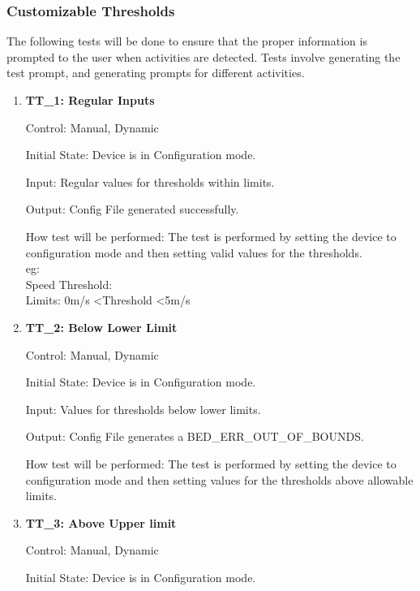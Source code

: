 \documentclass[12pt, titlepage]{article}
\begin{document}
\newpage

\subsubsection{Customizable Thresholds}

The following tests will be done to ensure that the proper information is prompted to the user when activities are detected. Tests involve generating the test prompt, and generating prompts for different activities.
		
\begin{enumerate}
	\item{\textbf{TT\_1: Regular Inputs} \\}\label{TT1}
	
		Control: Manual, Dynamic
							
		Initial State: Device is in Configuration mode.
							
		Input: Regular values for thresholds within limits.
		
		Output: Config File generated successfully.
		
		How test will be performed: The test is performed by setting the device to configuration mode and then setting valid values for the thresholds.\\
		eg: \\
		Speed Threshold:\\
		Limits: 0m/s \textless Threshold \textless 5m/s

	\item{\textbf{TT\_2: Below Lower Limit} \\}\label{TT2}
	
		Control: Manual, Dynamic
							
		Initial State: Device is in Configuration mode.
							
		Input: Values for thresholds below lower limits.
		
		Output: Config File generates a BED\_ERR\_OUT\_OF\_BOUNDS.

		How test will be performed: The test is performed by setting the device to configuration mode and then setting values for the thresholds above allowable limits.


	\item{\textbf{TT\_3: Above Upper limit }\\}\label{TT3}
	
		Control: Manual, Dynamic
							
		Initial State: Device is in Configuration mode.
							

\end{enumerate}
\end{document}

